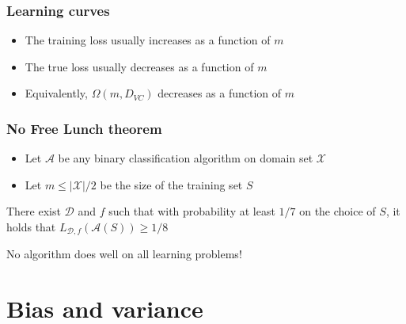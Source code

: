 \documentclass[10pt]{beamer}
\begin{document}
\begin{frame}
  \frametitle{Learning curves}
  \begin{center}
  \end{center}
  \begin{itemize}
	\item The training loss usually {\color{red} increases} as a function of $m$
	\item The true loss usually {\color{blue} decreases} as a function of $m$
	\item Equivalently, $\Omega(m,D_{VC})$ {\color{green} decreases} as a function of $m$
  \end{itemize}
\end{frame}

\begin{frame}
  \frametitle{No Free Lunch theorem}
  \begin{itemize}
	\item Let $\mathcal{A}$ be any binary classification algorithm on domain set $\mathcal{X}$
	\item Let $m\leq|\mathcal{X}|/2$ be the size of the training set $S$
  \end{itemize}
  \pause
  \begin{theorem}
	There exist $\mathcal{D}$ and $f$ such that with probability at least $1/7$ on the choice of $S$, it holds that $L_{\mathcal{D},f}(\mathcal{A}(S)) \geq 1/8$
  \end{theorem}
  \pause
	{\color{red} No algorithm} does well on all learning problems!
\end{frame}

\section{Bias and variance}
\end{document}
